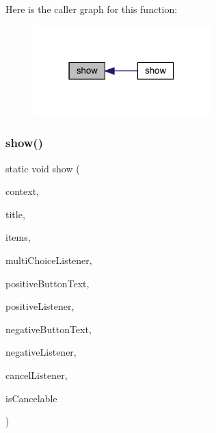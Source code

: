 Here is the caller graph for this function\+:
\nopagebreak
\begin{figure}[H]
\begin{center}
\leavevmode
\includegraphics[width=195pt]{classcom_1_1toast_1_1android_1_1gamebase_1_1base_1_1ui_1_1_simple_multi_choice_dialog_ace87d54d3c2e079150be0c80e4ad5f4f_icgraph}
\end{center}
\end{figure}
\mbox{\label{classcom_1_1toast_1_1android_1_1gamebase_1_1base_1_1ui_1_1_simple_multi_choice_dialog_a86ac518b83d512f55746c77621d72ed9}} 
\subsubsection{\texorpdfstring{show()}{show()}\hspace{0.1cm}{\footnotesize\ttfamily [2/3]}}
{\footnotesize\ttfamily static void show (\begin{DoxyParamCaption}\item[{@Non\+Null final Context}]{context,  }\item[{@Non\+Null final String}]{title,  }\item[{@Non\+Null final List$<$ String $>$}]{items,  }\item[{@Nullable final Dialog\+Interface.\+On\+Multi\+Choice\+Click\+Listener}]{multi\+Choice\+Listener,  }\item[{@Nullable final String}]{positive\+Button\+Text,  }\item[{@Nullable final Dialog\+Interface.\+On\+Click\+Listener}]{positive\+Listener,  }\item[{@Nullable final String}]{negative\+Button\+Text,  }\item[{@Nullable final Dialog\+Interface.\+On\+Click\+Listener}]{negative\+Listener,  }\item[{@Nullable final Dialog\+Interface.\+On\+Cancel\+Listener}]{cancel\+Listener,  }\item[{final boolean}]{is\+Cancelable }\end{DoxyParamCaption})\hspace{0.3cm}{\ttfamily [static]}}

